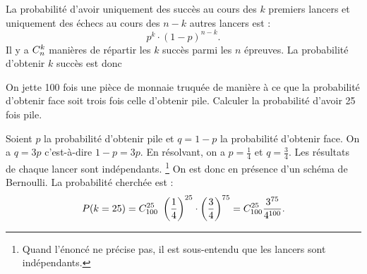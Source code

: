                         La probabilit\'e d'avoir 
                        uniquement des succ\`es au cours des $k$ premiers lancers
                        et uniquement des \'echecs au cours des $n-k$ autres lancers est : 
                              \begin{displaymath}
                                    p^k \cdot (1-p)^{n-k}.
                              \end{displaymath}
                        Il y a $C_{n}^{k}$ mani\`eres de r\'epartir les $k$ succ\`es parmi les $n$ \'epreuves.
                        La probabilit\'e d'obtenir $k$ succ\`es est donc 
                        \begin{ex}
                              On jette 100 fois une pi\`ece de monnaie truqu\'ee de mani\`ere \`a ce que 
                              la probabilit\'e d'obtenir face soit trois fois celle d'obtenir pile. \newline
                              Calculer la probabilit\'e d'avoir 25 fois pile.
                              \begin{valiny}
                                    Soient $p$ la probabilit\'e d'obtenir pile et $q = 1-p$ 
                                    la probabilit\'e d'obtenir face.
                                    On a $q = 3 p $ c'est-\`a-dire $1-p = 3p$.
                                    En r\'esolvant, on a $p = \frac{1}{4}$ et $q = \frac{3}{4}$.
                                    Les r\'esultats de chaque lancer sont ind\'ependants.
                                    \footnote{Quand l'\'enonc\'e ne pr\'ecise pas,
                                    il est sous-entendu que les lancers sont ind\'ependants.}
                                    On est donc en pr\'esence d'un sch\'ema de Bernoulli.
                                    La probabilit\'e cherch\'ee est :
                                    \begin{displaymath}
                                          P(k = 25) 
                                                = \C{100}{25}\ \left(\frac{1}{4}\right)^{25} \cdot \left(\frac{3}{4}\right)^{75}
                                                = \C{100}{25} \frac{3^{75}}{4^{100}}.
                                    \end{displaymath}
                              \end{valiny}
                        \end{ex}
